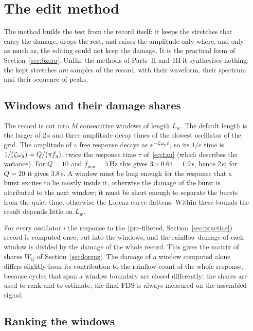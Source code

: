 \section{The edit method}\label{sec:edit}

The method  builds the test from the record itself: it keeps the stretches that carry the
damage, drops the rest, and raises the amplitude only where, and only as much as, the editing could not
keep the damage. It is the practical form of Section~\ref{sec:bzero}. Unlike the methods of Parts~II
and~III it synthesises nothing: the kept stretches are samples of the record, with their waveform,
their spectrum and their sequence of peaks.

\subsection{Windows and their damage shares}\label{sec:editwindows}

The record is cut into $M$ consecutive windows of length $L_w$. The default length is the larger of
2\,s and three amplitude decay times of the slowest oscillator of the grid. The amplitude of a free
response decays as $e^{-\zeta\omega_{\mathrm{n}} t}$, so its $1/e$ time is $1/(\zeta\omega_{\mathrm{n}}) = Q/(\pi f_{\mathrm{n}})$, twice the
response time $\tau$ of~\eqref{eq:tau} (which describes the variance). For $Q = 10$ and $f_{\min} =
5$\,Hz this gives $3\times 0.64 = 1.9$\,s, hence 2\,s; for $Q = 20$ it gives 3.8\,s. A window must be
long enough for the response that a burst excites to lie mostly inside it, otherwise the damage of the
burst is attributed to the next window; it must be short enough to separate the bursts from the quiet
time, otherwise the Lorenz curve flattens. Within these bounds the result depends little on $L_w$.

For every oscillator $i$ the response to the (pre-filtered, Section~\ref{sec:practice}) record is
computed once, cut into the windows, and the rainflow damage of each window is divided by the damage of
the whole record. This gives the matrix of shares $W_{ij}$ of Section~\ref{sec:lorenz}. The damage of
a window computed alone differs slightly from its contribution to the rainflow count of the whole
response, because cycles that span a window boundary are closed differently; the shares are used to
rank and to estimate, the final FDS is always measured on the assembled signal.

\subsection{Ranking the windows}\label{sec:ranking}

